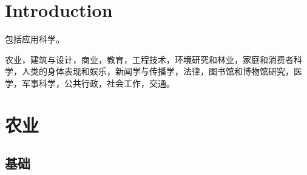 

\chapter{Introduction}

包括应用科学。

农业，建筑与设计，商业，教育，工程技术，环境研究和林业，家庭和消费者科学，人类的身体表现和娱乐，新闻学与传播学，法律，图书馆和博物馆研究，医学，军事科学，公共行政，社会工作，交通。



\chapter{农业}

\section{基础}


